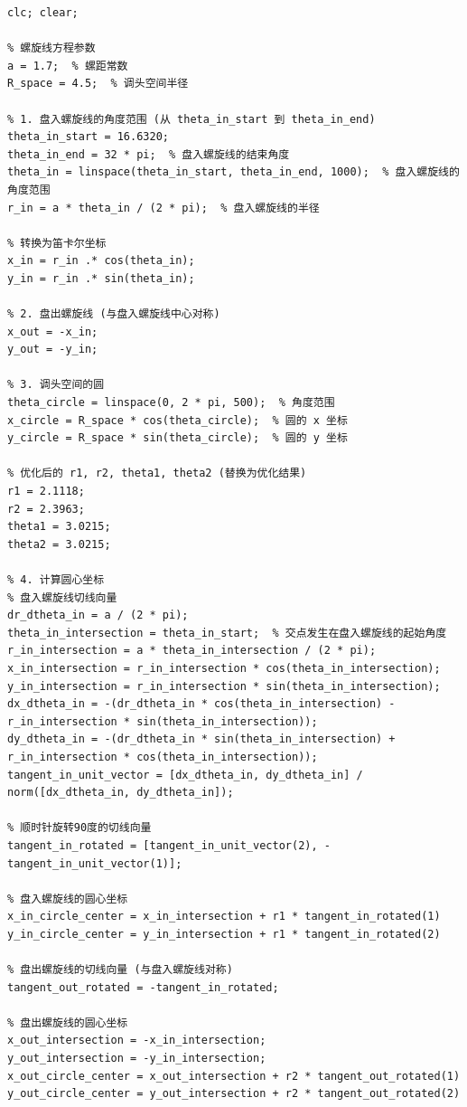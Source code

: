 \documentclass{cumcmthesis1}
\begin{document}
\begin{lstlisting}[caption={画出求得的最短调头路径的代码}, label={lst:seventh_code}]
clc; clear;

% 螺旋线方程参数
a = 1.7;  % 螺距常数
R_space = 4.5;  % 调头空间半径

% 1. 盘入螺旋线的角度范围 (从 theta_in_start 到 theta_in_end)
theta_in_start = 16.6320;
theta_in_end = 32 * pi;  % 盘入螺旋线的结束角度
theta_in = linspace(theta_in_start, theta_in_end, 1000);  % 盘入螺旋线的角度范围
r_in = a * theta_in / (2 * pi);  % 盘入螺旋线的半径

% 转换为笛卡尔坐标
x_in = r_in .* cos(theta_in);
y_in = r_in .* sin(theta_in);

% 2. 盘出螺旋线 (与盘入螺旋线中心对称)
x_out = -x_in;
y_out = -y_in;

% 3. 调头空间的圆
theta_circle = linspace(0, 2 * pi, 500);  % 角度范围
x_circle = R_space * cos(theta_circle);  % 圆的 x 坐标
y_circle = R_space * sin(theta_circle);  % 圆的 y 坐标

% 优化后的 r1, r2, theta1, theta2 (替换为优化结果)
r1 = 2.1118;
r2 = 2.3963;
theta1 = 3.0215;
theta2 = 3.0215;

% 4. 计算圆心坐标
% 盘入螺旋线切线向量
dr_dtheta_in = a / (2 * pi);
theta_in_intersection = theta_in_start;  % 交点发生在盘入螺旋线的起始角度
r_in_intersection = a * theta_in_intersection / (2 * pi);
x_in_intersection = r_in_intersection * cos(theta_in_intersection);
y_in_intersection = r_in_intersection * sin(theta_in_intersection);
dx_dtheta_in = -(dr_dtheta_in * cos(theta_in_intersection) - r_in_intersection * sin(theta_in_intersection));
dy_dtheta_in = -(dr_dtheta_in * sin(theta_in_intersection) + r_in_intersection * cos(theta_in_intersection));
tangent_in_unit_vector = [dx_dtheta_in, dy_dtheta_in] / norm([dx_dtheta_in, dy_dtheta_in]);

% 顺时针旋转90度的切线向量
tangent_in_rotated = [tangent_in_unit_vector(2), -tangent_in_unit_vector(1)];

% 盘入螺旋线的圆心坐标
x_in_circle_center = x_in_intersection + r1 * tangent_in_rotated(1)
y_in_circle_center = y_in_intersection + r1 * tangent_in_rotated(2)

% 盘出螺旋线的切线向量 (与盘入螺旋线对称)
tangent_out_rotated = -tangent_in_rotated;

% 盘出螺旋线的圆心坐标
x_out_intersection = -x_in_intersection;
y_out_intersection = -y_in_intersection;
x_out_circle_center = x_out_intersection + r2 * tangent_out_rotated(1)
y_out_circle_center = y_out_intersection + r2 * tangent_out_rotated(2)


\end{lstlisting}
\end{document}
